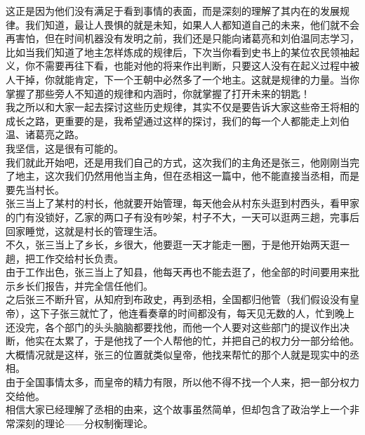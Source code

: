 \begin{multicols}{\theparacolNo}
这正是因为他们没有满足于看到事情的表面，而是深刻的理解了其内在的发展规律。我们知道，最让人畏惧的就是未知，如果人人都知道自己的未来，他们就不会再害怕，但在时间机器没有发明之前，我们还是只能向诸葛亮和刘伯温同志学习，比如当我们知道了地主怎样炼成的规律后，下次当你看到史书上的某位农民领袖起义，你不需要再往下看，也能对他的将来作出判断，只要这人没有在起义过程中被人干掉，你就能肯定，下一个王朝中必然多了一个地主。这就是规律的力量。当你掌握了那些旁人不知道的规律和内涵时，你就掌握了打开未来的钥匙！\\

我之所以和大家一起去探讨这些历史规律，其实不仅是要告诉大家这些帝王将相的成长之路，更重要的是，我希望通过这样的探讨，我们的每一个人都能走上刘伯温、诸葛亮之路。\\

我坚信，这是很有可能的。\\

我们就此开始吧，还是用我们自己的方式，这次我们的主角还是张三，他刚刚当完了地主，这次我们仍然用他当主角，但在丞相这一篇中，他不能直接当丞相，而是要先当村长。\\

张三当上了某村的村长，他就要开始管理，每天他会从村东头逛到村西头，看甲家的门有没锁好，乙家的两口子有没有吵架，村子不大，一天可以逛两三趟，完事后回家睡觉，这就是村长的管理生活。\\

不久，张三当上了乡长，乡很大，他要逛一天才能走一圈，于是他开始两天逛一趟，把工作交给村长负责。\\

由于工作出色，张三当上了知县，他每天再也不能去逛了，他全部的时间要用来批示乡长们报告，并完全信任他们。\\

之后张三不断升官，从知府到布政史，再到丞相，全国都归他管（我们假设没有皇帝），这下子张三就忙了，他连看奏章的时间都没有，每天见无数的人，忙到晚上还没完，各个部门的头头脑脑都要找他，而他一个人要对这些部门的提议作出决断，他实在太累了，于是他找了一个人帮他的忙，并把自己的权力分一部分给他。\\

大概情况就是这样，张三的位置就类似皇帝，他找来帮忙的那个人就是现实中的丞相。\\

由于全国事情太多，而皇帝的精力有限，所以他不得不找一个人来，把一部分权力交给他。\\

相信大家已经理解了丞相的由来，这个故事虽然简单，但却包含了政治学上一个非常深刻的理论——分权制衡理论。\\


\end{multicols}
